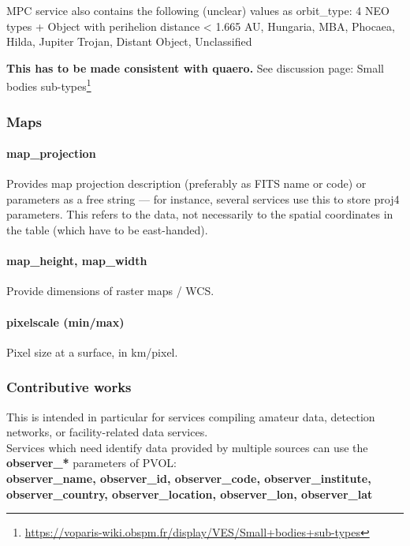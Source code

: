 \documentclass[11pt,a4paper]{ivoa}
\begin{document}
MPC service also contains the following (unclear) values as orbit\_type: 4 NEO types + Object with perihelion distance < 1.665 AU, Hungaria, MBA, Phocaea, Hilda, Jupiter Trojan, Distant Object, Unclassified


\textbf{This has to be made consistent with quaero. }See discussion page: Small bodies sub-types\footnote{\url{https://voparis-wiki.obspm.fr/display/VES/Small+bodies+sub-types}}

\subsubsection{Maps}

\paragraph{map\_projection}

Provides map projection description (preferably as FITS name or code) or parameters as a free string — for instance, several services use this to store proj4 parameters. This refers to the data, not necessarily to the spatial coordinates in the table (which have to be east-handed).

\paragraph{map\_height, map\_width}

Provide dimensions of raster maps / WCS.

\paragraph{pixelscale (min/max)}

Pixel size at a surface, in km/pixel.

\subsubsection{Contributive works}

This is intended in particular for services compiling amateur data, detection networks, or facility-related data services.\\Services\textbf{ }which need identify data provided by multiple sources can use the \textbf{observer\_* }parameters of PVOL: \\\textbf{observer\_name, observer\_id, observer\_code, observer\_institute, observer\_country, observer\_location, observer\_lon, observer\_lat}
\end{document}
